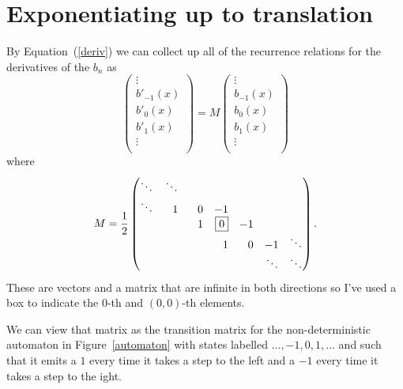 \documentclass{article}
\begin{document}
\section{Exponentiating up to translation}
By Equation~(\ref{deriv}) we can collect up all of the recurrence relations for the derivatives of the $b_n$ as
\[
\begin{pmatrix}
\vdots \\
b'_{-1}(x) \\
\boxed{b'_0(x)} \\
b'_1(x) \\
\vdots \\
\end{pmatrix}
=
M
\begin{pmatrix}
\vdots \\
b_{-1}(x) \\
\boxed{b_0(x)} \\
b_1(x) \\
\vdots \\
\end{pmatrix}
\]
where
\[
M=\frac{1}{2}
\begin{pmatrix*}[r]
\ddots & \ddots &   &    &   &   &        \\
\ddots & \hphantom{-{}}1 & 0 & -1 &   &   &        \\
       &   & \phantom{-{}}1 & \boxed{0} & -1 &   &        \\
       &   &   & 1 & 0 & -1 & \ddots \\
       &   &   &   &   & \ddots & \ddots \\
\end{pmatrix*}.
\]
These are vectors and a matrix that are infinite in both directions so I've used a box to indicate the $0$-th and $(0,0)$-th elements.

We can view that matrix as the transition matrix for the non-deterministic automaton in Figure~\ref{automaton} with states labelled $\ldots, -1, 0, 1, \ldots$ and such that it emits a $1$ every time it takes a step to the left and a $-1$ every time it takes a step to the ight.
\end{document}
